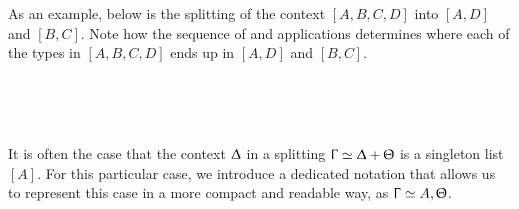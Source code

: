 As an example, below is the splitting of the context $[A, B, C, D]$ into $[A,
D]$ and $[B, C]$. Note how the sequence of 
and  applications determines where each of the
types in $[A, B, C, D]$ ends up in $[A, D]$ and $[B, C]$.

\begin{code}[hide]%
\>[0]\AgdaSpace{}%
\AgdaModule{\AgdaUnderscore{}}\AgdaSpace{}%
\<%
\\
\>[0][@{}l@{\AgdaIndent{0}}]%
\>[2]\AgdaSpace{}%
\AgdaSpace{}%
\AgdaSpace{}%
\AgdaSpace{}%
\AgdaSpace{}%
\AgdaSymbol{:}\AgdaSpace{}%
\<%
\end{code}
\begin{code}%
%
\>[2]\AgdaSpace{}%
\AgdaSymbol{:}\AgdaSpace{}%
\AgdaSymbol{(}\AgdaSpace{}%
\AgdaSpace{}%
\AgdaSpace{}%
\AgdaSpace{}%
\AgdaSpace{}%
\AgdaSpace{}%
\AgdaSpace{}%
\AgdaSpace{}%
\AgdaInductiveConstructor{[]}\AgdaSymbol{)}\AgdaSpace{}%
\AgdaSpace{}%
\AgdaSymbol{(}\AgdaSpace{}%
\AgdaSpace{}%
\AgdaSpace{}%
\AgdaSpace{}%
\AgdaInductiveConstructor{[]}\AgdaSymbol{)}\AgdaSpace{}%
\AgdaOperator{\AgdaDatatype{+}}\AgdaSpace{}%
\AgdaSymbol{(}\AgdaSpace{}%
\AgdaSpace{}%
\AgdaSpace{}%
\AgdaSpace{}%
\AgdaInductiveConstructor{[]}\AgdaSymbol{)}\<%
\\
%
\>[2]\AgdaSpace{}%
\AgdaSymbol{=}\AgdaSpace{}%
\AgdaSpace{}%
\AgdaSymbol{(}\AgdaSpace{}%
\AgdaSymbol{(}\AgdaSpace{}%
\AgdaSymbol{(}\AgdaSpace{}%
\AgdaSymbol{)))}\<%
\end{code}

It is often the case that the context $\Updelta$ in a splitting
$\Upgamma \simeq \Updelta + \Uptheta$ is a singleton list $[A]$. For this
particular case, we introduce a dedicated notation that allows us to represent
this case in a more compact and readable way, as
$\Upgamma \simeq A, \Uptheta$.

